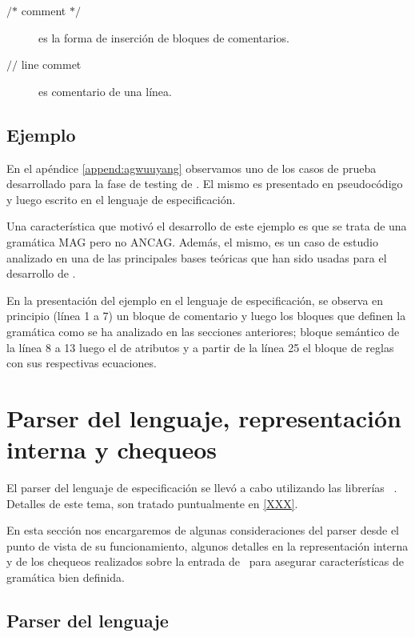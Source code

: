 \begin{description}
\item [$\textbf{/*}$ comment $\textbf{*/}$] es la forma de inserción de bloques de comentarios.
\item [$\textbf{//}$ line commet] es comentario de una línea.
\end{description} 

\subsection{Ejemplo}

En el apéndice \ref{append:agwuuyang} observamos uno de los casos de prueba desarrollado para la fase de testing de \maggen. El mismo es presentado en pseudocódigo y luego escrito en el lenguaje de especificación. 

Una característica que motivó el desarrollo de este ejemplo es que se trata de una gramática MAG pero no ANCAG. Además, el mismo, es un caso de estudio analizado en una de las principales bases teóricas que han sido usadas para el desarrollo de . 

En la presentación del ejemplo en el lenguaje de especificación, se observa en principio (línea 1 a 7) un bloque de comentario y luego los bloques que definen la gramática como se ha analizado en las secciones anteriores; bloque semántico de la línea 8 a 13 luego el de atributos y a partir de la línea 25 el bloque de reglas con sus respectivas ecuaciones.

 
\section{Parser del lenguaje, representación interna y chequeos}

El parser del lenguaje de especificación se llevó a cabo utilizando las librerías \boost\ \spirit. Detalles de este tema, son tratado puntualmente en \ref{XXX}. 

En esta sección nos encargaremos de algunas consideraciones del parser desde el punto de vista de su funcionamiento, algunos detalles en la representación interna y de los chequeos realizados sobre la entrada de \maggen\ para asegurar características de gramática bien definida.

\subsection*{Parser del lenguaje}

